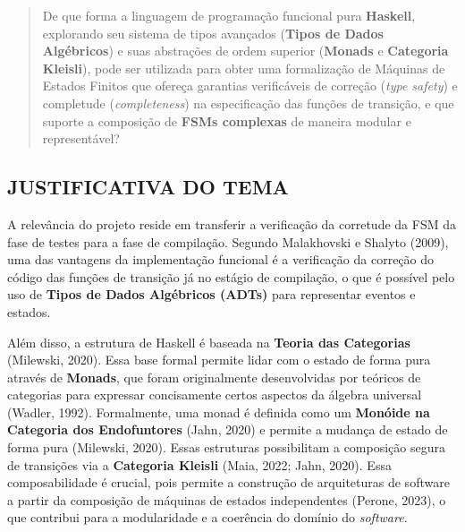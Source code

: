 \documentclass[12pt,a4paper]{article}
\begin{document}
\begin{quote}
   De que forma a linguagem de programação funcional pura \textbf{Haskell}, explorando seu sistema de tipos avançados (\textbf{Tipos de Dados Algébricos}) e suas abstrações de ordem superior (\textbf{Monads} e \textbf{Categoria Kleisli}), pode ser utilizada para obter uma formalização de Máquinas de Estados Finitos que ofereça garantias verificáveis de correção (\textit{type safety}) e completude (\textit{completeness}) na especificação das funções de transição, e que suporte a composição de \textbf{ FSMs complexas } de maneira modular e representável? 
\end{quote}

\subsection{JUSTIFICATIVA DO TEMA}

A relevância do projeto reside em transferir a verificação da corretude da FSM da fase de testes para a fase de compilação. Segundo Malakhovski e Shalyto (2009), uma das vantagens da implementação funcional é a verificação da correção do código das funções de transição já no estágio de compilação, o que é possível pelo uso de \textbf{Tipos de Dados Algébricos (ADTs)} para representar eventos e estados.

Além disso, a estrutura de Haskell é baseada na \textbf{Teoria das Categorias} (Milewski, 2020). Essa base formal permite lidar com o estado de forma pura através de \textbf{Monads}, que foram originalmente desenvolvidas por teóricos de categorias para expressar concisamente certos aspectos da álgebra universal (Wadler, 1992). Formalmente, uma monad é definida como um \textbf{Monóide na Categoria dos Endofuntores} (Jahn, 2020) e permite a mudança de estado de forma pura (Milewski, 2020). Essas estruturas possibilitam a composição segura de transições via a \textbf{Categoria Kleisli} (Maia, 2022; Jahn, 2020). Essa composabilidade é crucial, pois permite a construção de arquiteturas de software a partir da composição de máquinas de estados independentes (Perone, 2023), o que contribui para a modularidade e a coerência do domínio do \textit{software}.
\end{document}
